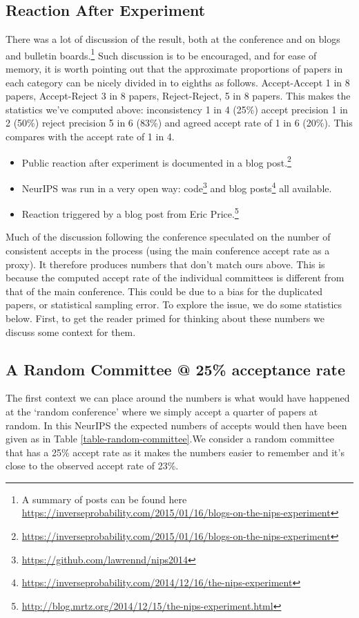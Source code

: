 \subsection{Reaction After Experiment}\label{reaction-after-experiment}

There was a lot of discussion of the result, both at the
conference and on blogs and bulletin boards.\footnote{A summary of posts can be found here \url{https://inverseprobability.com/2015/01/16/blogs-on-the-nips-experiment}} Such discussion is to be
encouraged, and for ease of memory, it is worth pointing out that the
approximate proportions of papers in each category can be nicely divided
in to eighths as follows. Accept-Accept 1 in 8 papers, Accept-Reject 3
in 8 papers, Reject-Reject, 5 in 8 papers. This makes the statistics
we've computed above: inconsistency 1 in 4 (25\%) accept precision 1 in
2 (50\%) reject precision 5 in 6 (83\%) and agreed accept rate of 1 in 6
(20\%). This compares with the accept rate of 1 in 4.

\begin{itemize}
\item
  Public reaction after experiment is documented in a blog post.\footnote{\url{https://inverseprobability.com/2015/01/16/blogs-on-the-nips-experiment}}

\item
  NeurIPS was run in a very open way:
  code\footnote{\url{https://github.com/lawrennd/nips2014}} and
  blog
  posts\footnote{\url{https://inverseprobability.com/2014/12/16/the-nips-experiment}} all available.
\item
  Reaction triggered by a blog post from Eric Price.\footnote{\url{http://blog.mrtz.org/2014/12/15/the-nips-experiment.html}}
\end{itemize}

Much of the discussion following the conference speculated on the number of consistent accepts in
the process (using the main conference accept rate as a proxy). It
therefore produces numbers that don't match ours above. This is because
the computed accept rate of the individual committees is different from
that of the main conference. This could be due to a bias for the
duplicated papers, or statistical sampling error. To explore the issue, we do some statistics below. First, to get the reader primed for thinking about
these numbers we discuss some context for them.


\subsection{A Random Committee @ 25\% acceptance rate}\label{a-random-committee-25}
The first context we can place around the numbers is what would have
happened at the `random conference' where we simply accept a quarter of
papers at random. In this NeurIPS the expected numbers of accepts would
then have been given as in Table \ref{table-random-committee}.We consider a random committee that has a 25\% accept rate as it makes the numbers easier to remember and it's close to the observed accept rate of 23\%.

